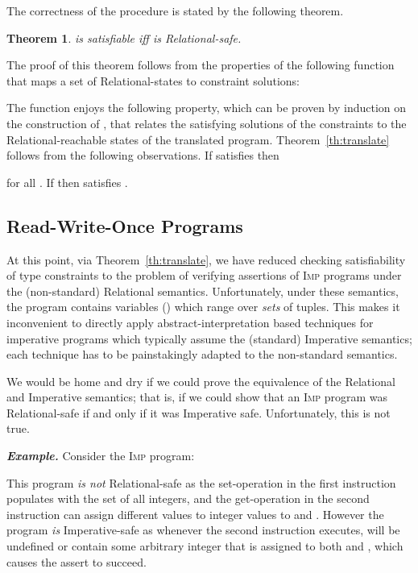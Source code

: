 \documentclass[nocopyrightspace]{sigplanconf}
\makeatletter
\newtheorem{@protheo}{Theorem}
\newenvironment{theorem}[1]{\begin{@protheo}{\rm \bf #1}\it}{\end{@protheo}}
\def\myexsh{\smallskip\noindent\textbf{\emph{Example.}\xspace}}
\newcommand{\ilang}{\textsc{Imp}\xspace}
\def\RELSEM{{Relational}\xspace}
\def\IMPSEM{{Imperative}\xspace}
\makeatother
\begin{document}
The correctness of the procedure is stated by the following theorem.

\begin{theorem}{}\label{th:translate}
 is satisfiable iff  is \emph{\RELSEM-safe}.
\end{theorem}

The proof of this theorem follows from the properties of the 
following function  that maps a set 
of \RELSEM-states to constraint solutions:

The function  enjoys the following property, which can be
proven by induction on the construction of , that relates the
satisfying solutions of the constraints to the \RELSEM-reachable states 
of the translated program. 
Theorem~\ref{th:translate} follows from the following observations.
If  satisfies  then 
      
for all .
If  then
       satisfies .



\subsection{Read-Write-Once Programs}
\label{sec:rwo}

At this point, via Theorem~\ref{th:translate}, we have reduced 
checking satisfiability of type constraints to the problem of
verifying assertions of \ilang programs under the 
(non-standard) \RELSEM semantics.
Unfortunately, under these semantics, the program contains variables 
() which range over \emph{sets} of tuples. 
This makes it inconvenient to directly apply abstract-interpretation
based techniques for imperative programs which typically assume the
(standard) \IMPSEM semantics; each technique has to be painstakingly
adapted to the non-standard semantics.

We would be home and dry if we could prove the equivalence of the 
\RELSEM and \IMPSEM semantics; that is, if we could show that 
an \ilang program was \RELSEM-safe if and only if it was \IMPSEM safe.
Unfortunately, this is not true.

\myexsh 
Consider the \ilang program:

This program \emph{is not} \RELSEM-safe as the set-operation in the first
instruction populates  with the set of all integers,
and the get-operation in the second instruction can assign different values
to integer values to  and .
However the program \emph{is} \IMPSEM-safe as whenever the second
instruction executes,  will be undefined or contain 
some arbitrary integer that is assigned to both  and , 
which causes the assert to succeed.
\end{document}
